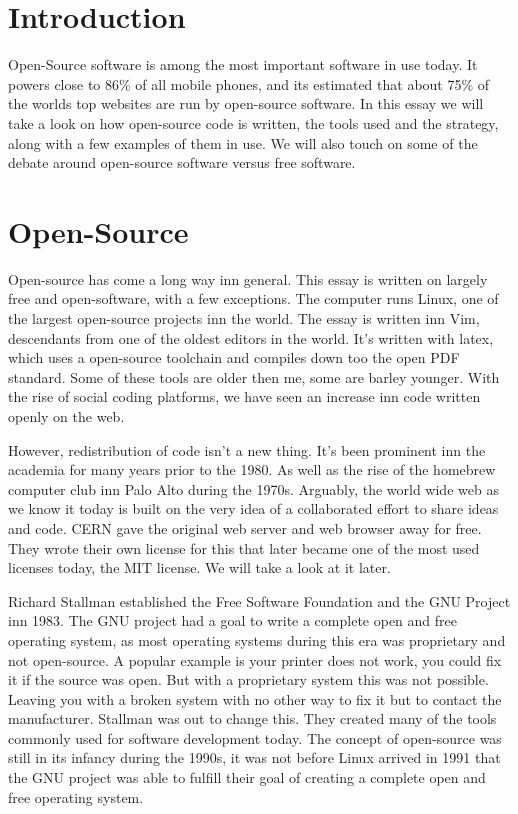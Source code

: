 \documentclass[12pt]{article}
\begin{document}
      \setcounter{tocdepth}{3}
      \tableofcontents

      \clearpage

      \setlength{\parskip}{0.2in}



\section{Introduction}
Open-Source software is among the most important software in use today. It
powers close to 86\% of all mobile phones\cite{idc}, and its estimated that
about 75\% of the worlds top websites are run by open-source
software\cite{pingdom}. In this essay we will take a look on how open-source code
is written, the tools used and the strategy, along with a few examples of them
in use. We will also touch on some of the debate around open-source software
versus free software.


\section{Open-Source}
Open-source has come a long way inn general. This essay is written on largely
free and open-software, with a few exceptions. The computer runs Linux, one of
the largest open-source projects inn the world. The essay is written inn Vim,
descendants from one of the oldest editors in the world.  It's written with
latex, which uses a open-source toolchain and compiles down too the open PDF
standard. Some of these tools are older then me, some are barley younger. With
the rise of social coding platforms, we have seen an increase inn code written
openly on the web.

However, redistribution of code isn't a new thing. It's been prominent inn the
academia for many years prior to the 1980. As well as the rise of the homebrew
computer club inn Palo Alto during the 1970s. Arguably, the world wide web as we
know it today is built on the very idea of a collaborated effort to share ideas
and code. CERN gave the original web server and web browser away for
free\cite{cern}. They wrote their own license for this that later became one of
the most used licenses today, the MIT license. We will take a look at it later.

Richard Stallman established the Free Software Foundation and the GNU Project
inn 1983.  The GNU project had a goal to write a complete open and free
operating system, as most operating systems during this era was proprietary and
not open-source\cite{fsf}. A popular example is your printer does not work, you could fix
it if the source was open.  But with a proprietary system this was not possible.
Leaving you with a broken system with no other way to fix it but to contact the
manufacturer.  Stallman was out to change this. They created many of the tools
commonly used for software development today.  The concept of open-source was
still in its infancy during the 1990s, it was not before Linux arrived in 1991
that the GNU project was able to fulfill their goal of creating a complete open
and free operating system.
\end{document}
